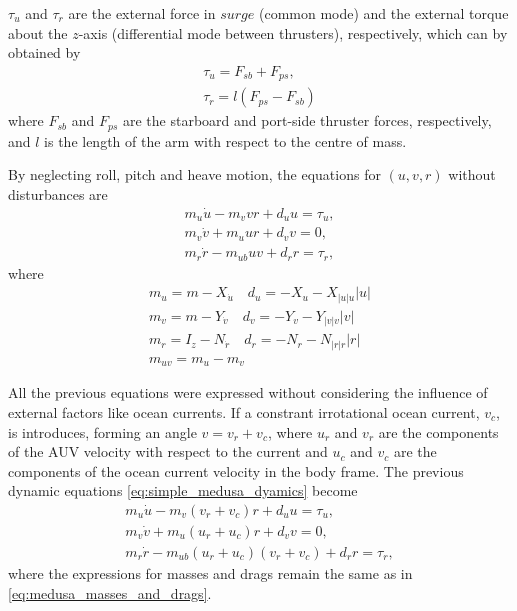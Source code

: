 \par $\tau_u$ and $\tau_r$ are the external force in $surge$ (common mode) and the external torque about the $z$-axis (differential mode between thrusters), respectively, which can by obtained by 
\begin{equation}
    \begin{gathered}
        \tau_u = F_{sb} + F_{ps}, \\
        \tau_r = l(F_{ps} - F_{sb})
    \end{gathered}
    \label{eq:simple_medusa_kinematics}
\end{equation}
where $F_{sb}$ and $F_{ps}$ are the starboard and port-side thruster forces, respectively, and $l$ is the length of the arm with respect to the centre of mass.
\par By neglecting roll, pitch and heave motion, the equations for $(u,v,r)$ without disturbances are
\begin{equation} 
    \begin{gathered}
        m_u\dot{u} - m_v v r + d_u u = \tau_u, \\
        m_v \dot{v} + m_u u r + d_v v = 0, \\
        m_r \dot{r} - m_{ub} u v + d_r r = \tau_r,
    \end{gathered}
    \label{eq:simple_medusa_dyamics}
\end{equation}
where
\begin{equation}
    \begin{gathered}
        m_u = m - X_{\dot{u}} \quad d_u = - X_u - X_{|u|u} |u| \\
        m_v = m - Y_{\dot{v}} \quad d_v = - Y_v - Y_{|v|v}|v| \\
        m_r = I_z - N_{\dot{r}} \quad d_r = - N_r - N_{|r|r}|r| \\
        m_{uv} = m_u - m_v
    \end{gathered}
    \label{eq:medusa_masses_and_drags}
\end{equation}


\par All the previous equations were expressed without considering the influence of external factors like ocean currents. If a constrant irrotational ocean current, $v_c$, is introduces, forming an angle $v = v_r+v_c$, where $u_r$ and $v_r$ are the components of the \acs{AUV} velocity with respect to the current and $u_c$ and $v_c$ are the components of the ocean current velocity in the body frame.
The previous dynamic equations \eqref{eq:simple_medusa_dyamics} become
\begin{equation}
    \begin{gathered}
        m_u\dot{u}-m_v(v_r+v_c)r+d_u u=\tau_u, \\
        m_v\dot{v}+m_u(u_r+u_c) r + d_v v=0, \\
        m_r\dot{r}-m_{ub}(u_r+u_c)(v_r+v_c)+d_r r=\tau_r,
    \end{gathered}
\end{equation}
where the expressions for masses and drags remain the same as in \eqref{eq:medusa_masses_and_drags}.


